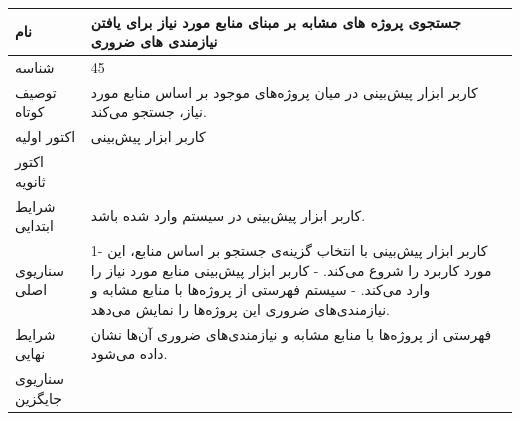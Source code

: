 \begin{tabular}{|p{2cm}|p{10cm}|}
\hline
نام
&
جستجوی پروژه های مشابه بر مبنای منابع مورد نیاز برای یافتن نیازمندی های ضروری
\\
\hline
شناسه
&
45
\\
\hline
توصیف کوتاه
&
کاربر ابزار پیش‌بینی در میان پروژه‌های موجود بر اساس منابع مورد نیاز، جستجو می‌کند.
\\
\hline
اکتور اولیه
&
کاربر ابزار پیش‌بینی
\\
\hline
اکتور ثانویه
&

\\
\hline
شرایط ابتدایی
&
کاربر ابزار پیش‌بینی در سیستم وارد شده باشد.
\\
\hline
سناریوی اصلی
&
1- کاربر ابزار پیش‌بینی با انتخاب گزینه‌ی جستجو بر اساس منابع، این مورد کاربرد را شروع می‌کند.
\newline
2- کاربر ابزار پیش‌بینی منابع مورد نیاز را وارد می‌کند.
\newline
3- سیستم فهرستی از پروژه‌ها با منابع مشابه و نیازمندی‌های ضروری این پروژه‌ها را نمایش می‌دهد.
\\
\hline
شرایط نهایی
&
فهرستی از پروژه‌ها با منابع مشابه و نیازمندی‌های ضروری آن‌ها نشان داده می‌شود.
\\
\hline
سناریوی جایگزین
&

\\
\hline
\end{tabular}